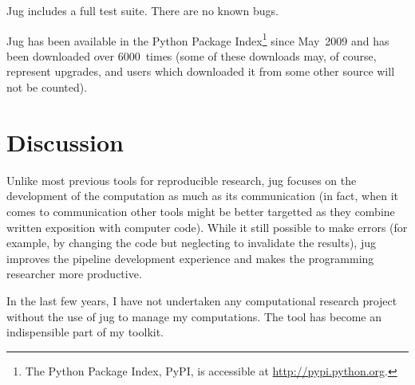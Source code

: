 \documentclass{article}
\begin{document}
Jug includes a full test suite. There are no known bugs.

Jug has been available in the Python Package Index\footnote{The Python Package
Index, PyPI, is accessible at \url{http://pypi.python.org}.} since May~2009
and has been downloaded over 6000~times (some of these downloads may, of
course, represent upgrades, and users which downloaded it from some other
source will not be counted).%

\section{Discussion}
Unlike most previous tools for reproducible research, jug focuses on the
development of the computation as much as its communication (in fact, when it
comes to communication other tools might be better targetted as they combine
written exposition with computer code). While it still possible to make errors
(for example, by changing the code but neglecting to invalidate the results),
jug improves the pipeline development experience and makes the programming
researcher more productive.

In the last few years, I have not undertaken any computational research project
without the use of jug to manage my computations. The tool has become an
indispensible part of my toolkit.
\end{document}
